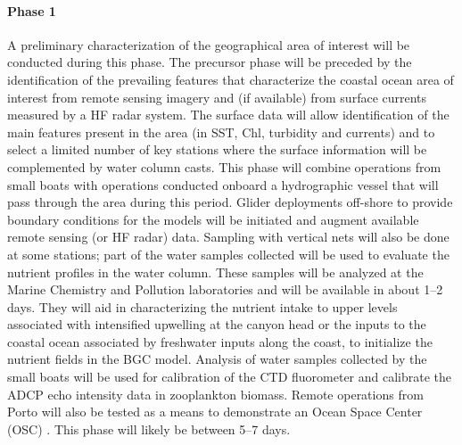 \paragraph{Phase 1} A preliminary characterization of the geographical
area of interest will be conducted during this phase. The precursor
phase will be preceded by the identification of the prevailing features
that characterize the coastal ocean area of interest from remote sensing
imagery and (if available) from surface currents measured by a HF radar
system. The surface data will allow identification of the main features
present in the area (in SST, Chl, turbidity and currents) and to select
a limited number of key stations where the surface information will be
complemented by water column casts. %
This phase will combine operations from small boats with operations
conducted onboard a \inst hydrographic vessel that will pass through the
area during this period. Glider deployments off-shore to provide
boundary conditions for the models will be initiated and augment
available remote sensing (or HF radar) data. Sampling with vertical nets
will also be done at some stations; part of the water samples collected
will be used to evaluate the nutrient profiles in the water column.
These samples will be analyzed at the \inst Marine Chemistry and
Pollution laboratories and will be available in about 1--2 days. They
will aid in characterizing the nutrient intake to upper levels
associated with intensified upwelling at the canyon head or the inputs
to the coastal ocean associated by freshwater inputs along the coast, to
initialize the nutrient fields in the BGC model. Analysis of water
samples collected by the small boats will be used for calibration of the
CTD fluorometer and calibrate the ADCP echo intensity data in
zooplankton biomass. Remote operations from Porto will also be tested as
a means to demonstrate an Ocean Space Center (OSC) \cite{lima21}. This
phase will likely be between 5--7 days.

 

